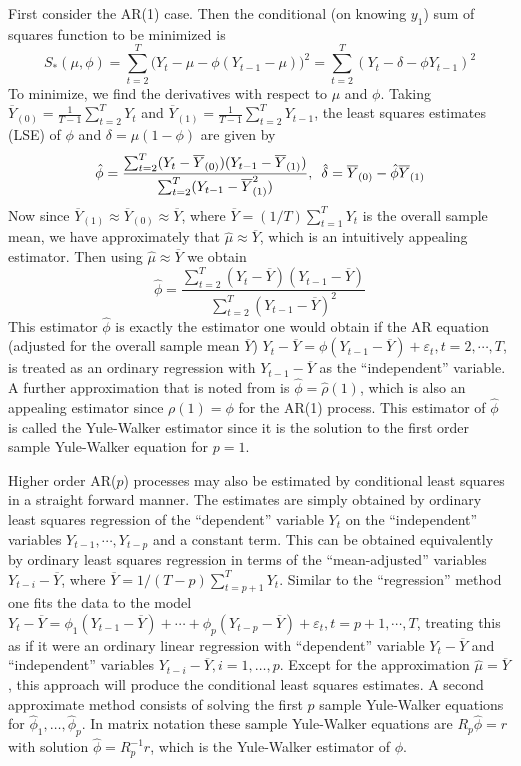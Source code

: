 First consider the AR(1) case. Then the conditional (on knowing $y_1$) sum of squares function to be minimized is
	\[
	S_*(\mu,\phi) = \sum_{t=2}^T \big(Y_t - \mu - \phi(Y_{t-1} - \mu) \big)^2 = \sum_{t=2}^T (Y_t - \delta - \phi Y_{t-1})^2
	\]
To minimize, we find the derivatives with respect to $\mu$ and $\phi$. Taking $\overline{Y}_{(0)} = \frac{1}{T-1} \sum_{t=2}^T Y_t$ and $\overline{Y}_{(1)} = \frac{1}{T-1} \sum_{t=2}^T Y_{t-1}$, the least squares estimates (LSE) of $\phi$ and $\delta = \mu(1 - \phi)$ are given by
	\[
	\hat{\phi} = \dfrac{\sum_{t=2}^T(Y_t - \overline{Y}_{(0)})(Y_{t-1} - \overline{Y}_{(1)})}{\sum_{t=2}^T(Y_{t-1} - \overline{Y}_{(1)}^2)} ,  \enskip \hat{\delta} = \overline{Y}_{(0)} - \hat{\phi}\overline{Y}_{(1)}
	\]
Now since $\overline{Y}_{(1)} \approx \overline{Y}_{(0)} \approx \overline{Y}$, where $\overline{Y} = (1/T)\sum_{t=1}^T Y_t$ is the overall sample mean, we have approximately that $\hat{\mu} \approx \overline{Y}$, which is an intuitively appealing estimator. Then using $\hat{\mu} \approx \overline{Y}$ we obtain
	\begin{equation}\label{eqn:anotherhatphi}
	\hat{\phi} = \frac{\sum_{t=2}^T(Y_t - \overline{Y})(Y_{t-1} - \overline{Y})}{\sum_{t=2}^T(Y_{t-1} - \overline{Y})^2}
	\end{equation}
This estimator $\hat{\phi}$ is exactly the estimator one would obtain if the AR equation (adjusted for the overall sample mean $\overline{Y}$) $Y_t - \overline{Y} = \phi(Y_{t-1} - \overline{Y}) + \varepsilon_t, t = 2,\cdots,T$, is treated as an ordinary regression with $Y_{t-1} - \overline{Y}$ as the ``independent'' variable. A further approximation that is noted from \cite{campbellgross} is $\hat{\phi}=\hat{\rho}(1)$,
which is also an appealing estimator since $\rho(1) = \phi$ for the AR(1) process. This estimator of $\hat{\phi}$ is called the Yule-Walker estimator since it is the solution to the first order sample Yule-Walker equation for $p=1$. 


Higher order AR($p$) processes may also be estimated by conditional least squares in a straight forward manner. The estimates are simply obtained by ordinary least squares regression of the ``dependent'' variable $Y_t$ on the ``independent'' variables $Y_{t-1},\cdots,Y_{t-p}$ and a constant term. This can be obtained equivalently by ordinary least squares regression in terms of the ``mean-adjusted'' variables $Y_{t-i} - \overline{Y}$, where $\overline{Y}= 1/(T - p)\sum_{t=p+1}^T Y_{t}$. Similar to the ``regression'' method one fits the data to the model $Y_t - \overline{Y} = \phi_1(Y_{t-1} - \overline{Y}) + \cdots + \phi_p(Y_{t-p} - \overline{Y}) + \varepsilon_t, t = p+1,\cdots,T$, treating this as if it were an ordinary linear regression with ``dependent'' variable $Y_t - \overline{Y}$ and ``independent'' variables $Y_{t-i} - \overline{Y}, i = 1,\ldots,p$. Except for the approximation $\hat{\mu} = \overline{Y}$, this approach will produce the conditional least squares estimates. A second approximate method consists of solving the first $p$ sample Yule-Walker equations for $\hat{\phi}_1,\ldots,\hat{\phi}_p$. In matrix notation these sample Yule-Walker equations are $R_p\hat{\phi} = r$ with solution $\hat{\phi} = R_p^{-1}r$, which is the Yule-Walker estimator of $\phi$.


